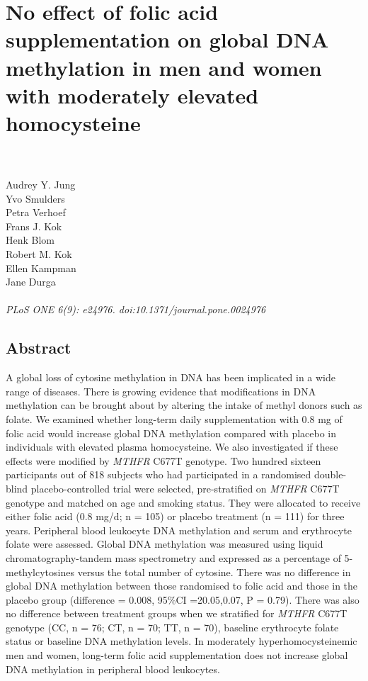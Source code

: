 \chapter[Folic acid supplementation and global DNA methylation]{No effect of folic acid supplementation on global DNA methylation in men and women with moderately elevated homocysteine}
\label{chap4_FACIT} 

\quad\\

\quad\\
Audrey Y. Jung\\ 
Yvo Smulders\\ 
Petra Verhoef\\ 
Frans J. Kok\\ 
Henk Blom\\ 
Robert M. Kok\\ 
Ellen Kampman\\ 
Jane Durga\\ 

\quad\\


\emph{PLoS ONE 6(9): e24976. doi:10.1371/journal.pone.0024976}

\newpage 

\section*{Abstract}

\noindent A global loss of cytosine methylation in DNA has been implicated in a wide range of diseases. There is growing evidence that modifications in DNA methylation can be brought about by altering the intake of methyl donors such as folate. We examined whether long-term daily supplementation with 0.8 mg of folic acid would increase global DNA methylation compared with placebo in individuals with elevated plasma homocysteine. We also investigated if these effects were modified by \emph{MTHFR} C677T genotype. Two hundred sixteen participants out of 818 subjects who had participated in a randomised double-blind placebo-controlled trial were selected, pre-stratified on \emph{MTHFR} C677T genotype and matched on age and smoking status. They were allocated to receive either folic acid (0.8 mg/d; n = 105) or placebo treatment (n = 111) for three years. Peripheral blood leukocyte DNA methylation and serum and erythrocyte folate were assessed. Global DNA methylation was measured using liquid chromatography-tandem mass spectrometry and expressed as a percentage of 5-methylcytosines versus the total number of cytosine. There was no difference in global DNA methylation between those randomised to folic acid and those in the placebo group (difference = 0.008, 95\%CI =20.05,0.07, P = 0.79). There was also no difference between treatment groups when we stratified for \emph{MTHFR} C677T genotype (CC, n = 76; CT, n = 70; TT, n = 70), baseline erythrocyte folate status or baseline DNA methylation levels. In moderately hyperhomocysteinemic men and women, long-term folic acid supplementation does not increase global DNA methylation in peripheral blood leukocytes.

